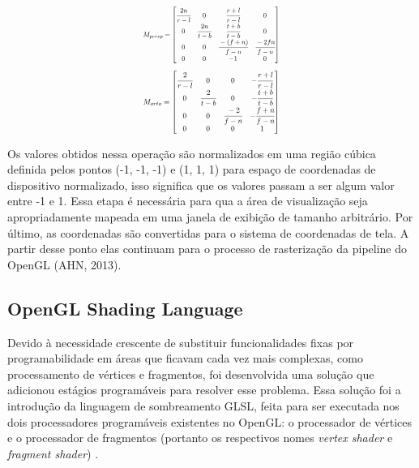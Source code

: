 	\begin{equation} \label{eq-persp}
		\resizebox{.35\hsize}{!}{$ M_{persp}
		=
		\begin{bmatrix}
			\cfrac{2n}{r-l} & 0 & \cfrac{r+l}{r-l} & 0 \\
			0 & \cfrac{2n}{t-b} & \cfrac{t+b}{t-b} & 0 \\
			0 & 0 & \cfrac{-(f+n)}{f-n} & \cfrac{-2fn}{f-n}\\
			0 & 0 & -1 & 0 \\
		\end{bmatrix} $}
	\end{equation}
	\begin{equation} \label{eq-ortho}
		\resizebox{.35\hsize}{!}{$ M_{orto}
		=
		\begin{bmatrix}
			\cfrac{2}{r-l} & 0 & 0 & -\cfrac{r+l}{r-l} \\
			0 & \cfrac{2}{t-b} & 0 & -\cfrac{t+b}{t-b} \\
			0 & 0 & \cfrac{-2}{f-n} & -\cfrac{f+n}{f-n}\\
			0 & 0 & 0 & 1 \\
		\end{bmatrix} $}
	\end{equation}

Os valores obtidos nessa operação são normalizados em uma região cúbica definida pelos pontos (-1, -1, -1) e (1, 1, 1) para espaço de coordenadas de dispositivo normalizado, isso significa que os valores passam a ser algum valor entre -1 e 1. Essa etapa é necessária para qua a área de visualização seja apropriadamente mapeada em uma janela de exibição de tamanho arbitrário. Por último, as coordenadas são convertidas para o sistema de coordenadas de tela. A partir desse ponto elas continuam para o processo de rasterização da pipeline do OpenGL (AHN, 2013)\nocite{openglOnline}. 

\subsection{OpenGL Shading Language}
\label{sec:glsl}

Devido à necessidade crescente de substituir funcionalidades fixas por programabilidade em áreas que ficavam cada vez mais complexas, como processamento de vértices e fragmentos, foi desenvolvida uma solução que adicionou estágios programáveis para resolver esse problema. Essa solução foi a introdução da linguagem de sombreamento \acrshort{GLSL}, feita para ser executada nos dois processadores programáveis existentes no OpenGL: o processador de vértices e o processador de fragmentos (portanto os respectivos nomes \textit{vertex shader} e \textit{fragment shader}) \cite{GLSLBook}. 

